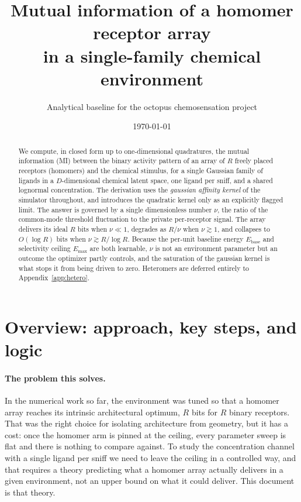 \documentclass[11pt,a4paper]{article}
\title{Mutual information of a homomer receptor array \\ in a single-family chemical environment}
\author{Analytical baseline for the octopus chemosensation project}
\date{\today}
\newcommand{\Ebase}{E_{\mathrm{base}}}
\newcommand{\Emax}{E_{\mathrm{max}}}
\begin{document}
\maketitle

\begin{abstract}
\noindent
We compute, in closed form up to one-dimensional quadratures, the mutual information
(MI) between the binary activity pattern of an array of $R$ freely placed receptors
(homomers) and the chemical stimulus, for a single Gaussian family of ligands in a
$D$-dimensional chemical latent space, one ligand per sniff, and a shared lognormal
concentration. The derivation uses the \emph{gaussian affinity kernel} of the simulator
throughout, and introduces the quadratic kernel only as an explicitly flagged limit. The
answer is governed by a single dimensionless number $\nu$, the ratio of the common-mode
threshold fluctuation to the private per-receptor signal. The array delivers its ideal
$R$ bits when $\nu \ll 1$, degrades as $R/\nu$ when $\nu \gtrsim 1$, and collapses to
$O(\log R)$ bits when $\nu \gtrsim R/\log R$. Because the per-unit baseline energy
$\Ebase$ and selectivity ceiling $\Emax$ are both learnable, $\nu$ is not an environment
parameter but an outcome the optimizer partly controls, and the saturation of the
gaussian kernel is what stops it from being driven to zero. Heteromers are deferred
entirely to Appendix~\ref{app:hetero}.
\end{abstract}

\section{Overview: approach, key steps, and logic}
\label{sec:overview}

\paragraph{The problem this solves.}
In the numerical work so far, the environment was tuned so that a homomer array reaches
its intrinsic architectural optimum, $R$ bits for $R$ binary receptors. That was the
right choice for isolating architecture from geometry, but it has a cost: once the
homomer arm is pinned at the ceiling, every parameter sweep is flat and there is nothing
to compare against. To study the concentration channel with a single ligand per sniff we
need to leave the ceiling in a controlled way, and that requires a theory predicting what
a homomer array actually delivers in a given environment, not an upper bound on what it
could deliver. This document is that theory.
\end{document}
